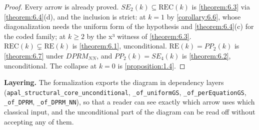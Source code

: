 \begin{proof}
Every arrow is already proved. $SE_{2}(k) ⊆ \mathrm{REC}(k)$ is \cref{theorem:6.3} via \cref{theorem:6.4}(d), and the inclusion is strict: at $k = 1$ by \cref{corollary:6.6}, whose diagonalization needs the uniform form of the hypothesis and \cref{theorem:6.4}(c) for the coded family; at $k ≥ 2$ by the x³ witness of \cref{theorem:6.3}. $\mathrm{REC}(k) ⊊ \mathrm{RE}(k)$ is \cref{theorem:6.1}, unconditional. $\mathrm{RE}(k) = PP_{2}(k)$ is \cref{theorem:6.7} under $DPRM_{NN}$, and $PP_{2}(k) = SE_{4}(k)$ is \cref{theorem:6.2}, unconditional. The collapse at $k = 0$ is \cref{proposition:1.4}.

\end{proof}
\textbf{Layering.} The formalization exports the diagram in dependency layers (\texttt{apal\_\allowbreak{}structural\_\allowbreak{}core\_\allowbreak{}unconditional}, \texttt{\_\allowbreak{}of\_\allowbreak{}uniformGS}, \texttt{\_\allowbreak{}of\_\allowbreak{}perEquationGS}, \texttt{\_\allowbreak{}of\_\allowbreak{}DPRM}, \texttt{\_\allowbreak{}of\_\allowbreak{}DPRM\_\allowbreak{}NN}), so that a reader can see exactly which arrow uses which classical input, and the unconditional part of the diagram can be read off without accepting any of them.


